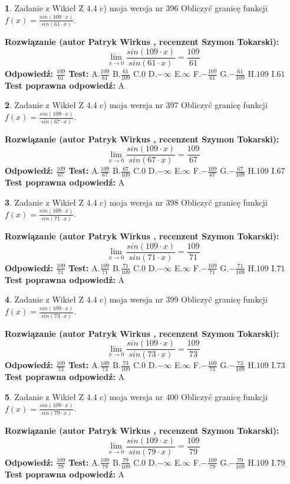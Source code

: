 \documentclass[12pt, a4paper]{article}
\theoremstyle{definition} %
\newtheorem{zad}{}
\newcommand{\zadStart}[1]{\begin{zad}#1\newline}
\newcommand{\zadStop}{\end{zad}}
\newcommand{\rozwStart}[2]{\noindent \textbf{Rozwiązanie (autor #1 , recenzent #2): }\newline}
\newcommand{\rozwStop}{\newline}
\newcommand{\odpStart}{\noindent \textbf{Odpowiedź:}\newline}
\newcommand{\odpStop}{\newline}
\newcommand{\testStart}{\noindent \textbf{Test:}\newline}
\newcommand{\testStop}{\newline}
\newcommand{\kluczStart}{\noindent \textbf{Test poprawna odpowiedź:}\newline}
\newcommand{\kluczStop}{\newline}
\begin{document}
\zadStart{Zadanie z Wikieł Z 4.4 c) moja wersja nr 396}
Obliczyć granicę funkcji $f(x)=\frac{sin(109\cdot x)}{sin(61\cdot x)}$.
\zadStop
\rozwStart{Patryk Wirkus}{Szymon Tokarski}
$$\lim\limits_{x\to 0}\frac{sin(109\cdot x)}{sin(61\cdot x)}=
\frac{109}{61}$$
\rozwStop
\odpStart
$\frac{109}{61}$
\odpStop
\testStart
A.$\frac{109}{61}$
B.$\frac{61}{109}$
C.$0$
D.$-\infty$
E.$\infty$
F.$-\frac{109}{61}$
G.$-\frac{61}{109}$
H.$109$
I.$61$
\testStop
\kluczStart
A
\kluczStop



\zadStart{Zadanie z Wikieł Z 4.4 c) moja wersja nr 397}
Obliczyć granicę funkcji $f(x)=\frac{sin(109\cdot x)}{sin(67\cdot x)}$.
\zadStop
\rozwStart{Patryk Wirkus}{Szymon Tokarski}
$$\lim\limits_{x\to 0}\frac{sin(109\cdot x)}{sin(67\cdot x)}=
\frac{109}{67}$$
\rozwStop
\odpStart
$\frac{109}{67}$
\odpStop
\testStart
A.$\frac{109}{67}$
B.$\frac{67}{109}$
C.$0$
D.$-\infty$
E.$\infty$
F.$-\frac{109}{67}$
G.$-\frac{67}{109}$
H.$109$
I.$67$
\testStop
\kluczStart
A
\kluczStop



\zadStart{Zadanie z Wikieł Z 4.4 c) moja wersja nr 398}
Obliczyć granicę funkcji $f(x)=\frac{sin(109\cdot x)}{sin(71\cdot x)}$.
\zadStop
\rozwStart{Patryk Wirkus}{Szymon Tokarski}
$$\lim\limits_{x\to 0}\frac{sin(109\cdot x)}{sin(71\cdot x)}=
\frac{109}{71}$$
\rozwStop
\odpStart
$\frac{109}{71}$
\odpStop
\testStart
A.$\frac{109}{71}$
B.$\frac{71}{109}$
C.$0$
D.$-\infty$
E.$\infty$
F.$-\frac{109}{71}$
G.$-\frac{71}{109}$
H.$109$
I.$71$
\testStop
\kluczStart
A
\kluczStop



\zadStart{Zadanie z Wikieł Z 4.4 c) moja wersja nr 399}
Obliczyć granicę funkcji $f(x)=\frac{sin(109\cdot x)}{sin(73\cdot x)}$.
\zadStop
\rozwStart{Patryk Wirkus}{Szymon Tokarski}
$$\lim\limits_{x\to 0}\frac{sin(109\cdot x)}{sin(73\cdot x)}=
\frac{109}{73}$$
\rozwStop
\odpStart
$\frac{109}{73}$
\odpStop
\testStart
A.$\frac{109}{73}$
B.$\frac{73}{109}$
C.$0$
D.$-\infty$
E.$\infty$
F.$-\frac{109}{73}$
G.$-\frac{73}{109}$
H.$109$
I.$73$
\testStop
\kluczStart
A
\kluczStop



\zadStart{Zadanie z Wikieł Z 4.4 c) moja wersja nr 400}
Obliczyć granicę funkcji $f(x)=\frac{sin(109\cdot x)}{sin(79\cdot x)}$.
\zadStop
\rozwStart{Patryk Wirkus}{Szymon Tokarski}
$$\lim\limits_{x\to 0}\frac{sin(109\cdot x)}{sin(79\cdot x)}=
\frac{109}{79}$$
\rozwStop
\odpStart
$\frac{109}{79}$
\odpStop
\testStart
A.$\frac{109}{79}$
B.$\frac{79}{109}$
C.$0$
D.$-\infty$
E.$\infty$
F.$-\frac{109}{79}$
G.$-\frac{79}{109}$
H.$109$
I.$79$
\testStop
\kluczStart
A
\kluczStop
\end{document}
